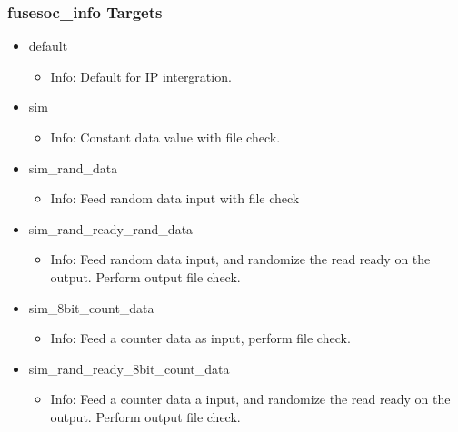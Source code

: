 \subsubsection{fusesoc\_info Targets}
\begin{itemize}
\item default
	\begin{itemize}
	\item[$\space$] Info: Default for IP intergration.
	\end{itemize}
\item sim
	\begin{itemize}
	\item[$\space$] Info: Constant data value with file check.
	\end{itemize}
\item sim\_rand\_data
	\begin{itemize}
	\item[$\space$] Info: Feed random data input with file check
	\end{itemize}
\item sim\_rand\_ready\_rand\_data
	\begin{itemize}
	\item[$\space$] Info: Feed random data input, and randomize the read ready on the output. Perform output file check.
	\end{itemize}
\item sim\_8bit\_count\_data
	\begin{itemize}
	\item[$\space$] Info: Feed a counter data as input, perform file check.
	\end{itemize}
\item sim\_rand\_ready\_8bit\_count\_data
	\begin{itemize}
	\item[$\space$] Info: Feed a counter data a input, and randomize the read ready on the output. Perform output file check.
	\end{itemize}
\end{itemize}
